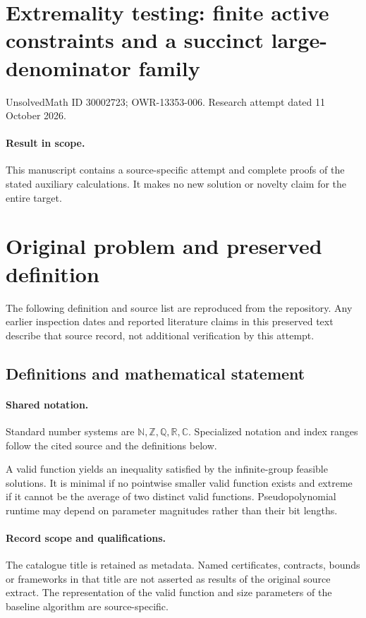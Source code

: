 \documentclass[11pt]{article}
\begin{document}
\section*{Extremality testing: finite active constraints and a succinct large-denominator family}
\noindent UnsolvedMath ID 30002723; OWR-13353-006. Research attempt dated 11 October 2026.
\paragraph{Result in scope.}This manuscript contains a source-specific attempt and complete proofs of the stated auxiliary calculations. It makes no new solution or novelty claim for the entire target.
\section{Original problem and preserved definition}
The following definition and source list are reproduced from the repository. Any earlier inspection dates and reported literature claims in this preserved text describe that source record, not additional verification by this attempt.
\subsection{Definitions and mathematical statement}

\paragraph{Shared notation.}Standard number systems are $\mathbb N,\mathbb Z,\mathbb Q,\mathbb R,\mathbb C$. Specialized notation and index ranges follow the cited source and the definitions below.


A valid function yields an inequality satisfied by the infinite-group feasible solutions. It is minimal if no pointwise smaller valid function exists and extreme if it cannot be the average of two distinct valid functions. Pseudopolynomial runtime may depend on parameter magnitudes rather than their bit lengths.
\paragraph{Record scope and qualifications.}
The catalogue title is retained as metadata. Named certificates, contracts, bounds or frameworks in that title are not asserted as results of the original source extract.
The representation of the valid function and size parameters of the baseline algorithm are source-specific.
\end{document}
